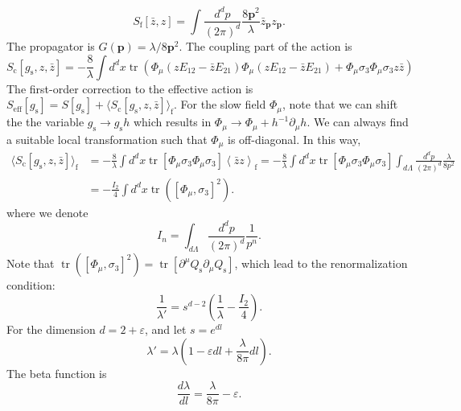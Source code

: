 \documentclass[aps,prb,superscriptaddress,nofootinbib]{revtex4}
\def \tr{\operatorname{tr}}
\begin{document}
\begin{equation}
	S_{\mathrm{f}}[\bar z, z] =  \int \frac{d^d p}{(2\pi)^d} \frac{8\bm p^2}{\lambda} \bar{z}_{\bm{p}} z_{\bm{p}}.
\end{equation}
The propagator is $G(\bm p) = \lambda/8\bm p^2$. 
The coupling part of the action is
\begin{equation}
	S_{\mathrm{c}}\left[g_{\mathrm{s}}, z, \bar{z}\right]=-\frac{8}{\lambda} \int d^{d} x \operatorname{tr}\left(\Phi_{\mu}\left(z E_{12}-\bar{z} E_{21}\right) \Phi_{\mu}\left(z E_{12}-\bar{z} E_{21}\right)+\Phi_{\mu} \sigma_{3} \Phi_{\mu} \sigma_{3} z \bar{z}\right)
\end{equation}
The first-order correction to the effective action is $S_\mathrm{eff}[g_{\mathrm{s}}] = S[g_{\mathrm{s}}] + \langle S_{\mathrm{c}}[g_{\mathrm{s}},z,\bar z]\rangle_{\mathrm{f}}$.
For the slow field $\Phi_\mu$, note that we can shift the the variable $g_{\mathrm{s}} \rightarrow g_{\mathrm{s}} h$ which results in $\Phi_\mu \rightarrow \Phi_\mu + h^{-1}\partial_\mu h$.
We can always find a suitable local transformation such that $\Phi_\mu$ is off-diagonal.
In this way,
\begin{equation}
\begin{aligned}
	\langle S_{\mathrm{c}}[g_{\mathrm{s}},z,\bar z]\rangle_{\mathrm{f}} 
	&= -\frac{8}{\lambda} \int d^{d} x \operatorname{tr}\left[\Phi_{\mu} \sigma_{3} \Phi_{\mu} \sigma_{3} \right] \left\langle  \bar z z \right\rangle_{\mathrm{f}} 
	= -\frac{8}{\lambda} \int d^{d} x \operatorname{tr}\left[\Phi_{\mu} \sigma_{3} \Phi_{\mu} \sigma_{3} \right] \int_{d\Lambda} \frac{d^d p}{(2\pi)^d}\frac{\lambda}{8p^2} \\
	&= -\frac{I_2}{4} \int d^{d} x \operatorname{tr}\left([\Phi_{\mu},\sigma_{3}]^2\right).
\end{aligned}
\end{equation}
where we denote 
\begin{equation}
	I_n = \int_{d\Lambda} \frac{d^d p}{(2\pi)^d}\frac{1}{p^n}.
\end{equation}
Note that $\tr\left([\Phi_{\mu},\sigma_{3}]^2\right) = \tr[\partial^\mu Q_{\mathrm{s}} \partial_\mu Q_{\mathrm{s}}]$, which lead to the renormalization condition:
\begin{equation}
	\frac{1}{\lambda'} = s^{d-2}\left(\frac{1}{\lambda} -\frac{I_2}{4}\right).
\end{equation}
For the dimension $d=2+\varepsilon$, and let $s=e^{dl}$
\begin{equation}
	\lambda' = \lambda \left(1-\varepsilon dl + \frac{\lambda}{8\pi} dl \right).
\end{equation}
The beta function is
\begin{equation}
	\frac{d\lambda}{dl} = \frac{\lambda}{8\pi} - \varepsilon.
\end{equation}
\end{document}
